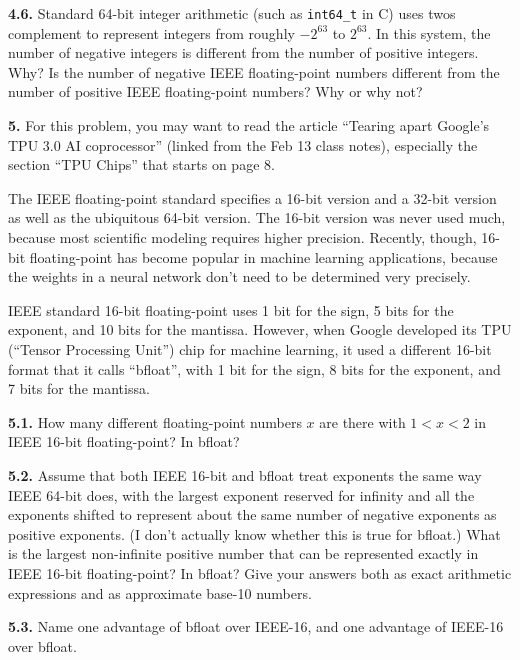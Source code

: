 \documentclass[11pt]{article}
\begin{document}
\par\medskip
{\bf 4.6.}
Standard 64-bit integer arithmetic (such as {\tt int64\_t} in C) uses
twos complement to represent integers from roughly $-2^{63}$ to $2^{63}$.
In this system, the number of negative integers is different from the number of
positive integers. Why? Is the number of negative IEEE floating-point numbers
different from the number of positive IEEE floating-point numbers? 
Why or why not?

\par\bigskip
{\bf 5.}
For this problem, you may want to read the article 
``Tearing apart Google's TPU 3.0 AI coprocessor'' 
(linked from the Feb 13 class notes),
especially the section ``TPU Chips'' that starts on page 8.

The IEEE floating-point standard specifies a 16-bit version 
and a 32-bit version as well as the ubiquitous 64-bit version.
The 16-bit version was never used much, 
because most scientific modeling requires higher precision. 
Recently, though, 
16-bit floating-point has become popular in machine learning applications,
because the weights in a neural network don't need to be determined very precisely.

IEEE standard 16-bit floating-point uses 1 bit for the sign, 
5 bits for the exponent, and 10 bits for the mantissa. 
However, when Google developed its TPU (``Tensor Processing Unit'') chip
for machine learning, it used a different 16-bit format that it calls
``bfloat'', with 1 bit for the sign, 8 bits for the exponent, and 7 bits for the mantissa.

\par\medskip
{\bf 5.1.}
How many different floating-point numbers $x$ are there with $1 < x < 2$
in IEEE 16-bit floating-point? In bfloat?

\par\medskip
{\bf 5.2.}
Assume that both IEEE 16-bit and bfloat treat exponents the same way IEEE 64-bit
does, with the largest exponent reserved for infinity and all the exponents
shifted to represent about the same number of negative exponents as positive
exponents. (I don't actually know whether this is true for bfloat.)
What is the largest non-infinite positive number that can be represented exactly
in IEEE 16-bit floating-point? In bfloat? Give your answers both as exact
arithmetic expressions and as approximate base-10 numbers.

\par\medskip
{\bf 5.3.}
Name one advantage of bfloat over IEEE-16, 
and one advantage of IEEE-16 over bfloat.
\end{document}
